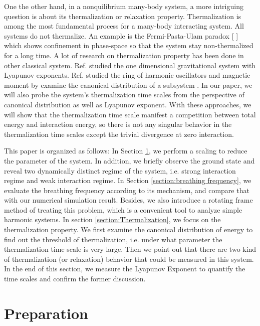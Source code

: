 \documentclass[aps,pre,twocolumn,groupedaddress]{revtex4-1}
\begin{document}
One the other hand, in a nonquilibrium many-body system, a more intriguing question is about its thermalization or relaxation property. Thermalization is among the most fundamental process for a many-body interacting system. All systems do not thermalize. An example is the Fermi-Pasta-Ulam paradox [ ] which shows confinement in phase-space so that the system stay non-thermalized for a long time. A lot of research on thermalization property has been done in other classical system. Ref.\cite{Tsuchiya2000}\cite{Yawn1997} studied the one dimensional gravitational system with Lyapunov exponents. Ref.\cite{Jin2013} studied the ring of harmonic oscillators and magnetic moment by examine the canonical distribution of a subsystem . In our paper, we will also probe the system's thermalization time scales from the perspective of canonical distribution as well as Lyapunov exponent. With these approaches, we will show that the thermalization time scale manifest a competition between total energy and interaction energy, so there is not any singular behavior in the thermalization time scales except the trivial divergence at zero interaction.

This paper is organized as follows: In Section \ref{section:preparation}, we perform a scaling to reduce the parameter of the system. In addition, we briefly observe the ground state and reveal two dynamically distinct regime of the system, i.e. strong interaction regime and weak interaction regime. In Section \ref{section:breathing frequency}, we evaluate the breathing frequency according to its mechanism, and compare that with our numerical simulation result. Besides, we also introduce a rotating frame method of treating this problem, which is a convenient tool to analyze simple harmonic systems. In section \ref{section:Thermalization}, we focus on the thermalization property. We first examine the canonical distribution of energy to find out the threshold of thermalization, i.e. under what parameter the thermalization time scale is very large. Then we point out that there are two kind of thermalization (or relaxation) behavior that could be measured in this system. In the end of this section, we measure the Lyapunov Exponent to quantify the time scales and confirm the former discussion.


\section{Preparation}\label{section:preparation}
\end{document}
